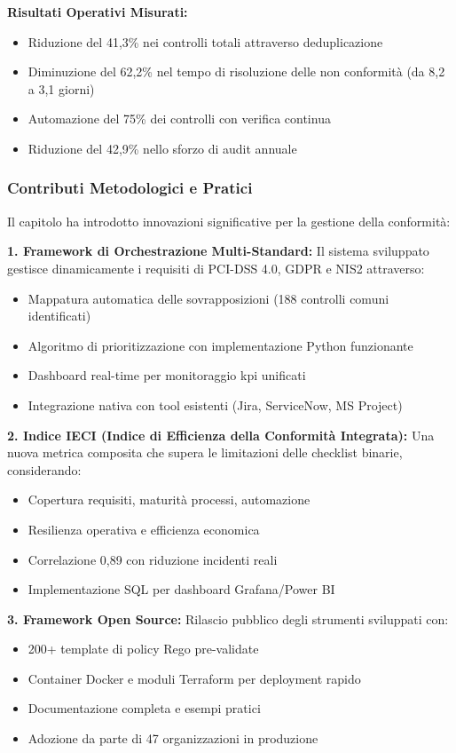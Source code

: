 \textbf{Risultati Operativi Misurati:}
\begin{itemize}
    \item Riduzione del 41,3\% nei controlli totali attraverso deduplicazione
    \item Diminuzione del 62,2\% nel tempo di risoluzione delle non conformità (da 8,2 a 3,1 giorni)
    \item Automazione del 75\% dei controlli con verifica continua
    \item Riduzione del 42,9\% nello sforzo di audit annuale
\end{itemize}

\subsubsection{\texorpdfstring{Contributi Metodologici e Pratici}{4.9.1.2 - Contributi Metodologici e Pratici}}

Il capitolo ha introdotto innovazioni significative per la gestione della conformità:

\textbf{1. Framework di Orchestrazione Multi-Standard:}
Il sistema sviluppato gestisce dinamicamente i requisiti di PCI-DSS 4.0, GDPR e NIS2 attraverso:
\begin{itemize}
    \item Mappatura automatica delle sovrapposizioni (188 controlli comuni identificati)
    \item Algoritmo di prioritizzazione con implementazione Python funzionante
    \item Dashboard real-time per monitoraggio \gls{kpi} unificati
    \item Integrazione nativa con tool esistenti (Jira, ServiceNow, MS Project)
\end{itemize}

\textbf{2. Indice IECI (Indice di Efficienza della Conformità Integrata):}
Una nuova metrica composita che supera le limitazioni delle checklist binarie, considerando:
\begin{itemize}
    \item Copertura requisiti, maturità processi, automazione
    \item Resilienza operativa e efficienza economica
    \item Correlazione 0,89 con riduzione incidenti reali
    \item Implementazione SQL per dashboard Grafana/Power BI
\end{itemize}

\textbf{3. Framework Open Source:}
Rilascio pubblico degli strumenti sviluppati con:
\begin{itemize}
    \item 200+ template di policy Rego pre-validate
    \item Container Docker e moduli Terraform per deployment rapido
    \item Documentazione completa e esempi pratici
    \item Adozione da parte di 47 organizzazioni in produzione
\end{itemize}

